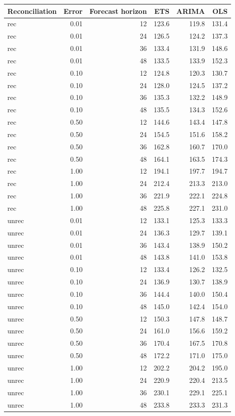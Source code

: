 \documentclass[11pt,a4paper,]{article}
\let\origtable\table
\let\endorigtable\endtable
\renewenvironment{table}[1][2] {
    \expandafter\origtable\expandafter[!htbp]
} {
    \endorigtable
}
\begin{document}
\begin{table}[!h]

\caption{\label{tab:TourismdatasimfixnoiseFH}Mean RMSE of fixed origin forecasts for simulated data (304 bottom-level series and 8 levels of hierarchy), for different error levels, methods (ETS, ARIMA, OLS), forecast horizons, with/without reconciliation.}
\centering
\begin{tabular}[t]{lrrrrr}
\toprule
Reconciliation & Error & Forecast horizon & ETS & ARIMA & OLS\\
\midrule
rec & 0.01 & 12 & 123.6 & 119.8 & 131.4\\
rec & 0.01 & 24 & 126.5 & 124.2 & 137.3\\
rec & 0.01 & 36 & 133.4 & 131.9 & 148.6\\
rec & 0.01 & 48 & 133.5 & 133.9 & 152.3\\
rec & 0.10 & 12 & 124.8 & 120.3 & 130.7\\
rec & 0.10 & 24 & 128.0 & 124.5 & 137.2\\
rec & 0.10 & 36 & 135.3 & 132.2 & 148.9\\
rec & 0.10 & 48 & 135.5 & 134.3 & 152.6\\
rec & 0.50 & 12 & 144.6 & 143.4 & 147.8\\
rec & 0.50 & 24 & 154.5 & 151.6 & 158.2\\
rec & 0.50 & 36 & 162.8 & 160.7 & 170.0\\
rec & 0.50 & 48 & 164.1 & 163.5 & 174.3\\
rec & 1.00 & 12 & 194.1 & 197.7 & 194.7\\
rec & 1.00 & 24 & 212.4 & 213.3 & 213.0\\
rec & 1.00 & 36 & 221.9 & 222.1 & 224.8\\
rec & 1.00 & 48 & 225.8 & 227.1 & 231.0\\
unrec & 0.01 & 12 & 133.1 & 125.3 & 133.3\\
unrec & 0.01 & 24 & 136.3 & 129.7 & 139.1\\
unrec & 0.01 & 36 & 143.4 & 138.9 & 150.2\\
unrec & 0.01 & 48 & 143.8 & 141.0 & 153.8\\
unrec & 0.10 & 12 & 133.4 & 126.2 & 132.5\\
unrec & 0.10 & 24 & 136.9 & 130.7 & 138.9\\
unrec & 0.10 & 36 & 144.4 & 140.0 & 150.4\\
unrec & 0.10 & 48 & 145.0 & 142.4 & 154.0\\
unrec & 0.50 & 12 & 150.3 & 147.8 & 148.7\\
unrec & 0.50 & 24 & 161.0 & 156.6 & 159.2\\
unrec & 0.50 & 36 & 170.4 & 167.5 & 170.8\\
unrec & 0.50 & 48 & 172.2 & 171.0 & 175.0\\
unrec & 1.00 & 12 & 202.2 & 204.2 & 195.0\\
unrec & 1.00 & 24 & 220.9 & 220.4 & 213.5\\
unrec & 1.00 & 36 & 230.1 & 229.1 & 225.1\\
unrec & 1.00 & 48 & 233.8 & 233.3 & 231.3\\
\bottomrule
\end{tabular}
\end{table}
\end{document}
